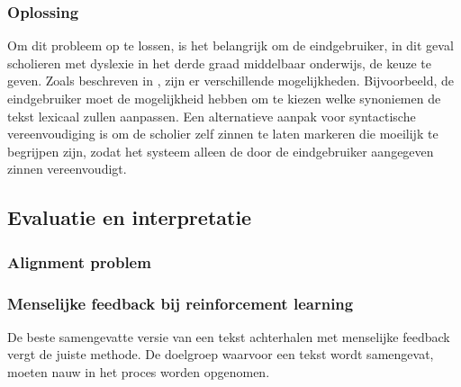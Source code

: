 \subsubsection{Oplossing}

Om dit probleem op te lossen, is het belangrijk om de eindgebruiker, in dit geval scholieren met dyslexie in het derde graad middelbaar onderwijs, de keuze te geven. Zoals beschreven in \textcite{Gooding2022}, zijn er verschillende mogelijkheden. Bijvoorbeeld, de eindgebruiker moet de mogelijkheid hebben om te kiezen welke synoniemen de tekst lexicaal zullen aanpassen. Een alternatieve aanpak voor syntactische vereenvoudiging is om de scholier zelf zinnen te laten markeren die moeilijk te begrijpen zijn, zodat het systeem alleen de door de eindgebruiker aangegeven zinnen vereenvoudigt.

\subsection{Evaluatie en interpretatie}

\subsubsection{Alignment problem}


\subsubsection{Menselijke feedback bij reinforcement learning}

De beste samengevatte versie van een tekst achterhalen met menselijke feedback vergt de juiste methode. De doelgroep waarvoor een tekst wordt samengevat, moeten nauw in het proces worden opgenomen.

